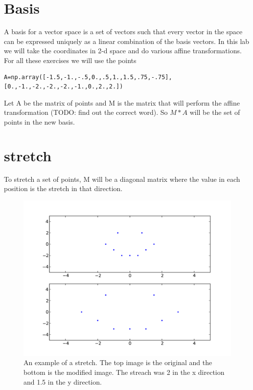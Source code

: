 \label{lab:ChangeBasis}


\section*{Basis}

A basis for a vector space is a set of vectors such that every vector in the space can be expressed uniquely as a linear combination of the basis vectors.
In this lab we will take the coordinates in 2-d space and do various affine transformations.
For all these exercises we will use the points
\begin{lstlisting}
A=np.array([-1.5,-1.,-.5,0.,.5,1.,1.5,.75,-.75],[0.,-1.,-2.,-2.,-2.,-1.,0.,2.,2.])
\end{lstlisting}
Let A be the matrix of points and M is the matrix that will perform the affine transformation (TODO: find out the correct word).
So $M*A$ will be the set of points in the new basis. 

\section*{stretch}
To stretch a set of points, M will be a diagonal matrix where the value in each position is the stretch in that direction.

\begin{figure}[H]
\includegraphics[scale = .5]{strench.pdf}
\caption{
An example of a stretch.
The top image is the original and the bottom is the modified image.
The streach was 2 in the x direction and 1.5 in the y direction.}
\end{figure}

